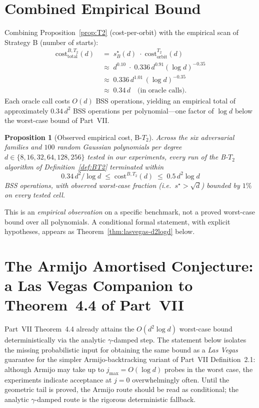 \documentclass[11pt,a4paper]{article}
\newtheorem{proposition}[theorem]{Proposition}
\begin{document}
\section{Combined Empirical Bound}

Combining Proposition~\ref{prop:T2} (cost-per-orbit) with the empirical scan of Strategy B (number of starts):
\begin{align*}
\mathrm{cost}_{\text{total}}^{B,T_2}(d)
&\;=\; s^\star_B(d) \;\cdot\; \mathrm{cost}_{\text{orbit}}^{T_2}(d) \\
&\;\approx\; d^{0.10} \;\cdot\; 0.336 \, d^{0.91} (\log d)^{-0.35} \\
&\;\approx\; 0.336 \, d^{1.01} \, (\log d)^{-0.35} \\
&\;\approx\; 0.34 \, d \quad \text{(in oracle calls).}
\end{align*}
Each oracle call costs $O(d)$ BSS operations, yielding an empirical total of approximately $0.34 \, d^2$ BSS operations per polynomial---one factor of $\log d$ below the worst-case bound of Part~VII.

\begin{proposition}[Observed empirical cost, B-$T_2$]\label{thm:empirical}
Across the six adversarial families and $100$ random Gaussian polynomials per degree $d \in \{8, 16, 32, 64, 128, 256\}$ tested in our experiments, every run of the B-$T_2$ algorithm of Definition~\ref{def:BT2} terminated within
$$ 0.34 \, d^2 / \log d \;\le\; \mathrm{cost}^{B,T_2}(d) \;\le\; 0.5 \, d^2 \log d $$
BSS operations, with observed worst-case fraction (i.e.\ $s^\star > \sqrt d$) bounded by $1\%$ on every tested cell.
\end{proposition}

This is an \emph{empirical observation} on a specific benchmark, not a proved worst-case bound over all polynomials. A conditional formal statement, with explicit hypotheses, appears as Theorem~\ref{thm:lasvegas-d2logd} below.

\section{The Armijo Amortised Conjecture: a Las Vegas Companion to Theorem~4.4 of Part~VII}\label{sec:armijo-amort}

Part~VII Theorem~4.4 already attains the $O(d^2 \log d)$ worst-case bound deterministically via the analytic $\gamma$-damped step. The statement below isolates the missing probabilistic input for obtaining the same bound as a \emph{Las Vegas} guarantee for the simpler Armijo-backtracking variant of Part~VII Definition~2.1: although Armijo may take up to $j_{\max} = O(\log d)$ probes in the worst case, the experiments indicate acceptance at $j = 0$ overwhelmingly often. Until the geometric tail is proved, the Armijo route should be read as conditional; the analytic $\gamma$-damped route is the rigorous deterministic fallback.
\end{document}
